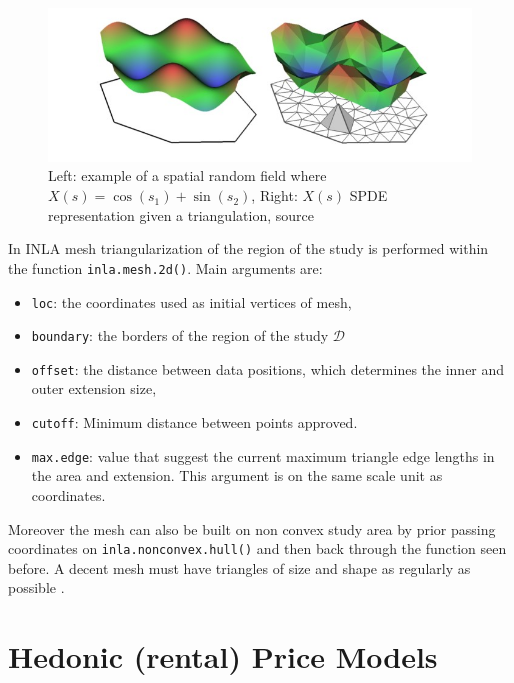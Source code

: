 \documentclass[
  12pt,
  a4paper,
  oneside]{book}
\newcommand{\passthrough}[1]{#1}
\providecommand{\tightlist}{%
  \setlength{\itemsep}{0pt}\setlength{\parskip}{0pt}}
\theoremstyle{definition}
\theoremstyle{definition}
\theoremstyle{definition}
\theoremstyle{remark}
\begin{document}
\begin{figure}
\centering
\includegraphics{images/spde_indexedsurface.jpg}
\caption{\label{fig:spdesurf}Left: example of a spatial random field where \(X(s)= \cos(s_1)+\sin(s_2)\), Right: \(X(s)\) SPDE representation given a triangulation, \citet{Cameletti2012} source}
\end{figure}

In INLA mesh triangularization of the region of the study is performed within the function \passthrough{\lstinline!inla.mesh.2d()!}. Main arguments are:

\begin{itemize}
\tightlist
\item
  \passthrough{\lstinline!loc!}: the coordinates used as initial vertices of mesh,
\item
  \passthrough{\lstinline!boundary!}: the borders of the region of the study \(\mathscr{D}\)
\item
  \passthrough{\lstinline!offset!}: the distance between data positions, which determines the inner and outer extension size,
\item
  \passthrough{\lstinline!cutoff!}: Minimum distance between points approved.
\item
  \passthrough{\lstinline!max.edge!}: value that suggest the current maximum triangle edge lengths in the area and extension. This argument is on the same scale unit as coordinates.
\end{itemize}

Moreover the mesh can also be built on non convex study area by prior passing coordinates on \passthrough{\lstinline!inla.nonconvex.hull()!} and then back through the function seen before. A decent mesh must have triangles of size and shape as regularly as possible \citep{Krainski-Rubio}.

\hypertarget{hedonic-rental-price-models}{%
\section{Hedonic (rental) Price Models}\label{hedonic-rental-price-models}}
\end{document}
